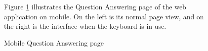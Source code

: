 \documentclass[12pt,oneside,openright,a4paper]{cpe-english-project}
\begin{document}
\begin{figure}[H]
\begin{minipage}{.3\textwidth}
      \end{minipage}%
      \caption{Mobile Question Answering page}\label{fig:Mobile_Question_Answering_page}
      \begin{justify}
        \qquad Figure \ref{fig:Mobile_Question_Answering_page} illustrates the Question Answering page of the web application on mobile. On the left is its normal page view, and on the right is the interface when the keyboard is in use. \par
      \end{justify}
    \end{figure}
\end{document}
